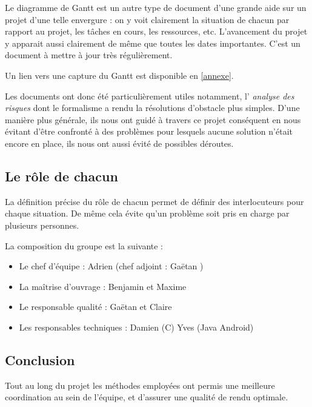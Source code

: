     Le diagramme de Gantt est un autre type de document d'une grande aide sur
    un projet d'une telle envergure : on y voit clairement la situation de
    chacun par rapport au projet, les tâches en cours, les ressources, etc.
    L'avancement du projet y apparait aussi clairement de même que toutes les
    dates importantes. C'est un document à mettre à jour très régulièrement.

    Un lien vers une capture du Gantt est disponible en \ref{annexe}.

    Les documents ont donc été particulièrement utiles notamment, l'\emph{
    analyse des risques} dont le formalisme a rendu la résolutions d'obstacle
    plus simples. D'une manière plus générale, ils nous ont guidé à travers ce
    projet conséquent en nous évitant d'être confronté à des problèmes pour
    lesquels aucune solution n'était encore en place, ils nous ont aussi évité
    de possibles déroutes.

  \subsection{Le rôle de chacun}

    La définition précise du rôle de chacun permet de définir des
    interlocuteurs pour chaque situation. De même cela évite qu'un problème
    soit pris en charge par plusieurs personnes.

    La composition du groupe est la suivante :
    \begin{itemize}
      \item Le chef d'équipe : Adrien  (chef adjoint : Gaëtan
      )
      \item La maîtrise d'ouvrage : Benjamin  et Maxime 
      \item Le responsable qualité : Gaëtan  et Claire 
      \item Les responsables techniques : Damien  (C) Yves  (Java Android)
    \end{itemize}


  \subsection{Conclusion}

    Tout au long du projet les méthodes employées ont permis une meilleure
    coordination au sein de l'équipe, et d'assurer une qualité de rendu
    optimale.


